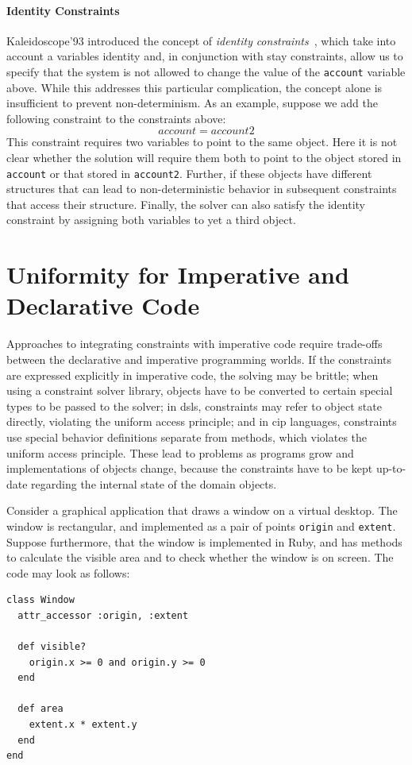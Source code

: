 \paragraph{Identity Constraints}
\label{sec:identity-constraints}
Kaleidoscope'93 introduced the concept of \emph{identity} \emph{constraints}~\cite{lopez-ecoop-1994}, which take into account a variables identity and, in
conjunction with stay constraints, allow us to specify that the system is not
allowed to change the value of the \lstinline!account! variable above. While
this addresses this particular complication, the concept alone is insufficient
to prevent non-determinism. As an example, suppose we add the following
constraint to the constraints above:
\[
account = account2
\]
This constraint requires two variables to point to the same object.
Here it is not clear whether the solution will require them both to
point to the object stored in \verb!account! or that stored in
\verb!account2!.  Further, if these objects have different structures
that can lead to non-deterministic behavior in subsequent constraints
that access their structure.  Finally, the solver can also satisfy the
identity constraint by assigning both variables to yet a third object.


\section{Uniformity for Imperative and Declarative Code}
\label{sec:unif-imper-decl-1}

Approaches to integrating constraints with imperative code require
trade-offs between the declarative and imperative programming
worlds. If the constraints are expressed explicitly in imperative
code, the solving may be brittle; when using a constraint solver
library, objects have to be converted to certain special types to be
passed to the solver; in \acp{dsl}, constraints may refer to object
state directly, violating the uniform access principle; and in
\ac{cip} languages, constraints use special behavior definitions
separate from methods, which violates the uniform access
principle. These lead to problems as programs grow and implementations
of objects change, because the constraints have to be kept up-to-date
regarding the internal state of the domain objects.

Consider a graphical application that draws a window on a virtual
desktop. The window is rectangular, and implemented as a pair of
points \verb!origin! and \verb!extent!. Suppose furthermore, that the
window is implemented in Ruby, and has methods to calculate the
visible area and to check whether the window is on screen. The code
may look as follows:
\begin{lstlisting}
class Window
  attr_accessor :origin, :extent

  def visible?
    origin.x >= 0 and origin.y >= 0
  end

  def area
    extent.x * extent.y
  end
end
\end{lstlisting}

